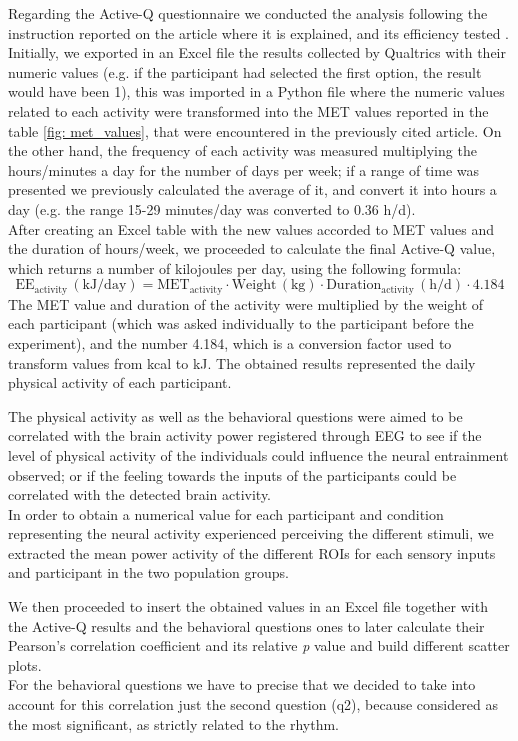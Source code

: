 Regarding the Active-Q questionnaire we conducted the analysis following the instruction reported on the article where it is explained, and its efficiency tested \parencite{Bonn_2012}. Initially, we exported in an Excel file the results collected by Qualtrics with their numeric values (e.g. if the participant had selected the first option, the result would have been 1), this was imported in a Python file where the numeric values related to each activity were transformed into the MET values reported in the table \ref{fig: met_values}, that were encountered in the previously cited article. On the other hand, the frequency of each activity was measured multiplying the hours/minutes a day for the number of days per week; if  a range of time was presented we previously calculated the average of it, and convert it into hours a day (e.g. the range 15-29 minutes/day was converted to 0.36 h/d).  \\
After creating an Excel table with the new values accorded to MET values and the duration of hours/week, we proceeded to calculate the final Active-Q value, which returns a number of kilojoules per day, using the following formula: 
\[
\text{EE}_{\text{activity}} \, (\text{kJ/day}) = \text{MET}_{\text{activity}} \cdot \text{Weight} \, (\text{kg}) \cdot \text{Duration}_{\text{activity}} \, (\text{h/d}) \cdot 4.184
\]
The MET value and duration of the activity were multiplied by the weight of each participant (which was asked individually to the participant before the experiment), and the number 4.184, which is a conversion factor used to transform values from kcal to kJ. The obtained results represented the daily physical activity of each participant. 

The physical activity as well as the behavioral questions were aimed to be correlated with the brain activity power registered through EEG to see if the level of physical activity of the individuals could influence the neural entrainment observed; or if the feeling towards the inputs of the participants could be correlated with the detected brain activity. \\ 
In order to obtain a numerical value for each participant and condition representing the neural activity experienced perceiving the different stimuli, we extracted the mean power activity of the different ROIs for each sensory inputs and participant in the two population groups. 

We then proceeded to insert the obtained values in an Excel file together with the Active-Q results and the behavioral questions ones to later calculate their Pearson's correlation coefficient and its relative \textit{p} value and build different scatter plots. \\
For the behavioral questions we have to precise that we decided to take into account for this correlation just the second question (q2), because considered as the most significant, as strictly related to the rhythm.

